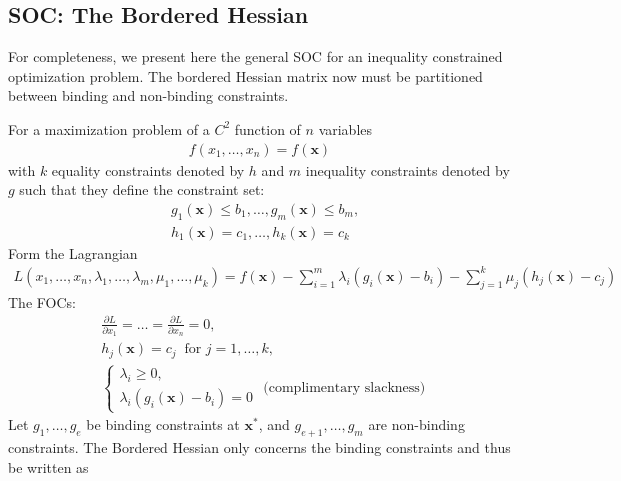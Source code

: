 \documentclass[10pt,a4paper]{book}
\theoremstyle{definition}\newtheorem{definition}{Definition}
\theoremstyle{definition}\newtheorem{fact}{Fact}
\theoremstyle{definition}\newtheorem{ex}{Ex.}
\theoremstyle{definition}\newtheorem{project}{Project}
\theoremstyle{definition}\newtheorem{problem}{Problem}
\theoremstyle{definition}\newtheorem{example}{Example}
\numberwithin{theorem}{chapter}
\numberwithin{corollary}{chapter}
\numberwithin{assumption}{chapter}
\numberwithin{definition}{chapter}
\numberwithin{prop}{chapter}
\numberwithin{notation}{chapter}
\numberwithin{problem}{chapter}
\numberwithin{example}{chapter}
\numberwithin{fact}{chapter}
\numberwithin{ex}{chapter}
\def\x{\mathbf x}
\begin{document}
	\subsection{SOC: The Bordered Hessian}
	For completeness, we present here the general SOC for an inequality constrained optimization problem. The bordered Hessian matrix now must be partitioned between binding and non-binding constraints. 
	
	For a maximization problem of a $C^2$ function of $n$ variables 
	\begin{align*}
		f(x_1, \dots, x_n) = f(\x)
	\end{align*}
	with $k$ equality constraints denoted by $h$ and $m$ inequality constraints denoted by $g$ such that they define the constraint set:
	\begin{align*}
		&g_1 (\x) \leq b_1, \dots, g_m(\x) \leq b_m, \\
		&h_1 (\x) = c_1, \dots, h_k (\x) = c_k
	\end{align*}
	Form the Lagrangian
	\begin{align*}
		L(x_1, \dots, x_n, \lambda_1,\dots,\lambda_m,\mu_1,\dots,\mu_k)
		= f(\x) - \sum^m_{i=1} \lambda_i (g_i(\x) - b_i) - \sum^k_{j=1} \mu_j (h_j(\x) - c_j)
	\end{align*}
	The FOCs:
	\begin{align*}
		&\frac{\partial L}{\partial x_1} = \dots = \frac{\partial L}{\partial x_n} = 0, \\
		&h_j(\x) = c_j \ \text{ for } j = {1,\dots,k}, \\
		&\begin{cases} 
			\lambda_i \geq 0, \\
			\lambda_i (g_i(\x) - b_i) = 0
		\end{cases} \text{ (complimentary slackness) }
	\end{align*}
	Let $g_1, \dots, g_e$ be binding constraints at $\x^*$, and $g_{e+1},\dots,g_m$ are non-binding constraints. The Bordered Hessian only concerns the binding constraints and thus be written as
	
\end{document}
